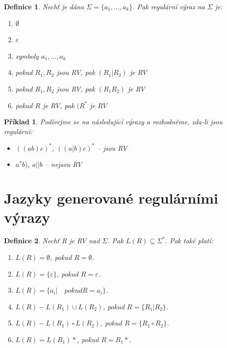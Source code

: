 \documentclass[10pt, a4paper, titlepage]{article}
\theoremstyle{note}
\newtheorem{definice}{Definice}
\newtheorem{priklad}{Příklad}
\begin{document}
\begin{definice}
Nechť je dána $\Sigma = \lbrace a_{1}, \ldots, a_{k} \rbrace$. Pak regulární výraz na $\Sigma$ je:
\begin{enumerate}
\item
$\emptyset$

\item
$\varepsilon$

\item
symboly $a_{1}, \ldots, a_{k}$

\item
pokud $R_{1}, R_{2}$ jsou RV, pak $(R_{1}|R_{2})$ je RV

\item
pokud $R_{1}, R_{2}$ jsou RV, pak $(R_{1}R_{2})$ je RV

\item
pokud $R$ je RV, pak $(R^{*}$ je RV
\end{enumerate}
\end{definice}

\begin{priklad}
Podívejme se na následující výrazy a rozhodněme, zda-li jsou regulární:

\begin{itemize}
\item
$((ab)c)^{*}$, $((a|b)c)^{*}$ -- jsou RV

\item
$a^{*}b)$, $a||b$ -- nejsou RV
\end{itemize}
\end{priklad}

\section{Jazyky generované regulárními výrazy}

\begin{definice}
Nechť \emph{R} je RV nad $\Sigma$. Pak $L(R) \subseteq \Sigma^{*}$. Pak také platí:

\begin{enumerate}
\item\label{jazyky-1}
$L(R) = \emptyset$, pokud $R = \emptyset$.

\item
$L(R) = \lbrace \varepsilon \rbrace$, pokud $R = \varepsilon$.

\item\label{jazyky-3}
$L(R) = \lbrace a_{i} | \quad pokud R=a_{i} \rbrace$.

\item\label{jazyky-4}
$L(R) - L(R_{1}) \cup L(R_{2})$, pokud $R=\lbrace R_{1} | R_{2} \rbrace$. 

\item\label{jazyky-5}
$L(R) - L(R_{1}) \circ L(R_{2})$, pokud $R=\lbrace R_{1}\circ R_{2} \rbrace$.

\item\label{jazyky-6}
$L(R) = L(R_{1})* $, pokud $R = R_{1}*$.
\end{enumerate}
\end{definice}
\end{document}
